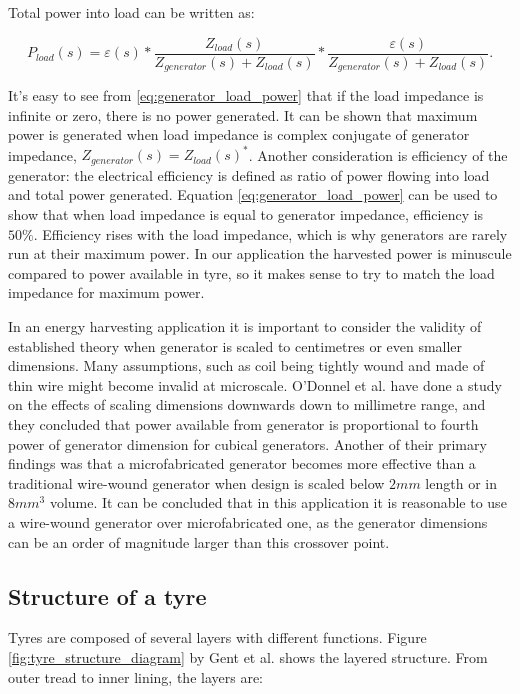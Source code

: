 Total power into load can be written as:

\begin{equation} \label{eq:generator_load_power}
  P_{load}(s) = \varepsilon(s)*\frac{Z_{load}(s)}{Z_{generator}(s)+Z_{load}(s)}*\frac{\varepsilon(s)}{Z_{generator}(s)+Z_{load}(s)}.
\end{equation}

It's easy to see from \eqref{eq:generator_load_power} that if the load impedance is infinite or zero, there is no power generated. It can be shown that maximum power is generated when load impedance is complex conjugate of generator impedance, $Z_{generator}(s) = {Z_{load}(s)}^*$. Another consideration is efficiency of the generator: the electrical efficiency is defined as ratio of power flowing into load and total power generated. Equation \eqref{eq:generator_load_power} can be used to show that when load impedance is equal to generator impedance, efficiency is $ 50 \%$. Efficiency rises with the load impedance, which is why generators are rarely run at their maximum power. In our application the harvested power is minuscule compared to power available in tyre, so it makes sense to try to match the load impedance for maximum power.

In an energy harvesting application it is important to consider the validity of established theory when generator is scaled to centimetres or even smaller dimensions. Many assumptions, such as coil being tightly wound and made of thin wire might become invalid at microscale. O'Donnel et al. \cite{ODonnell2007} have done a study on the effects of scaling dimensions downwards down to millimetre range, and they concluded that power available from generator is proportional to fourth power of generator dimension for cubical generators. Another of their primary findings was that a microfabricated generator becomes more effective than a traditional wire-wound generator when design is scaled below $2 mm$ length or in $8 mm^3$ volume. It can be concluded that in this application it is reasonable to use a wire-wound generator over microfabricated one, as the generator dimensions can be an order of magnitude larger than this crossover point. 


\subsection{Structure of a tyre}

Tyres are composed of several layers with different functions. Figure \ref{fig:tyre_structure_diagram} by Gent et
al. \cite{Gent2005} shows the layered structure. From outer tread to inner lining, the layers are: 

